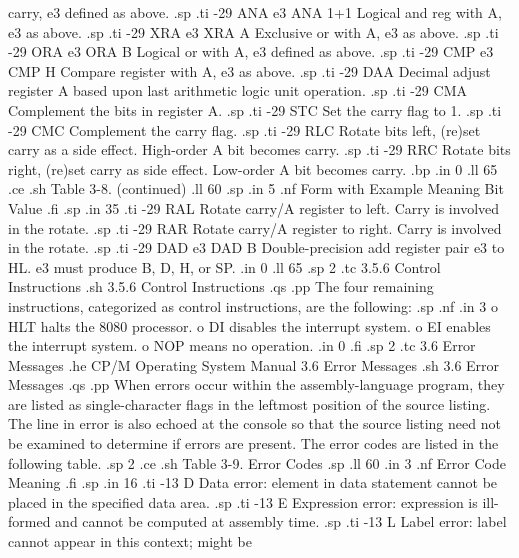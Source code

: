 carry, e3 defined as above.
.sp
.ti -29
ANA e3         ANA 1+1       Logical and reg with A, e3 as 
above.
.sp
.ti -29
XRA e3         XRA A         Exclusive or with A, e3 as above.
.sp
.ti -29
ORA e3         ORA B         Logical or with A, e3 defined as 
above.
.sp
.ti -29
CMP e3         CMP H         Compare register with A, e3 as 
above.
.sp
.ti -29
DAA                          Decimal adjust register A based 
upon last arithmetic logic unit operation.
.sp
.ti -29
CMA                          Complement the bits in register A.
.sp
.ti -29
STC                          Set the carry flag to 1.
.sp
.ti -29
CMC                          Complement the carry flag.
.sp
.ti -29
RLC                          Rotate bits left, (re)set carry as a 
side effect.  High-order A bit becomes carry.
.sp
.ti -29
RRC                          Rotate bits right, (re)set carry as 
side effect.  Low-order A bit becomes carry.
.bp
.in 0
.ll 65
.ce
.sh
Table 3-8.  (continued)
.ll 60
.sp
.in 5
.nf
Form with       Example                Meaning
Bit Value
.fi
.sp
.in 35
.ti -29
RAL                          Rotate carry/A register to left.
Carry is involved in the rotate.
.sp
.ti -29
RAR                          Rotate carry/A register to right.  
Carry is involved in the rotate.
.sp
.ti -29
DAD e3         DAD B         Double-precision add register pair 
e3 to HL.  e3 must produce B, D, H, or SP.
.in 0
.ll 65
.sp 2
.tc         3.5.6  Control Instructions
.sh
3.5.6  Control Instructions
.qs
.pp
The four remaining instructions, categorized as control instructions, are
the following:
.sp
.nf
.in 3
o HLT halts the 8080 processor.
o DI disables the interrupt system.
o EI enables the interrupt system.
o NOP means no operation.
.in 0
.fi
.sp 2
.tc    3.6  Error Messages
.he CP/M Operating System Manual                  3.6  Error Messages
.sh
3.6  Error Messages
.qs
.pp
When errors occur within the assembly-language program, they are 
listed as single-character flags in the leftmost position of the 
source listing.  The line in error is also echoed at the console 
so that the source listing need not be examined to determine if 
errors are present.  The error codes are listed in the following 
table.
.sp 2
.ce
.sh
Table 3-9.  Error Codes
.sp
.ll 60
.in 3
.nf
Error Code                       Meaning
.fi
.sp
.in 16
.ti -13
D            Data error:  element in data statement cannot be placed in 
the specified data area.
.sp
.ti -13
E            Expression error:  expression is ill-formed and cannot be 
computed at assembly time.
.sp
.ti -13
L            Label error:  label cannot appear in this context; might be 
